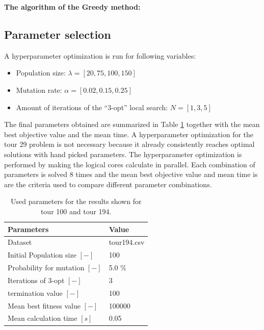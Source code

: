 \documentclass[a4paper,10pt]{article}
\newcommand{\ReplaceMe}[1]{{\color{blue}#1}}
\begin{document}
\textbf{The algorithm of the Greedy method:}

\subsection{Parameter selection}

A hyperparameter optimization is run for following variables:
\begin{itemize}
	\item Population size: $ \lambda = [20,75,100,150] $
	\item Mutation rate: $ \alpha = [0.02, 0.15,0.25]$
	\item Amount of iterations of the ``3-opt'' local search: $ N = [1,3,5] $
\end{itemize}

The final parameters obtained are summarized in Table \ref{t:parameters} together with the mean best objective value and the mean time. A hyperparameter optimization for the tour 29 problem is not necessary because it already consistently reaches optimal solutions with hand picked parameters. The hyperparameter optimization is performed by making the logical cores calculate in parallel. Each combination of parameters is solved $ 8 $ times and the mean best objective value and mean time is are the criteria used to compare different parameter combinations.

\begin{table}[h]
	\centering
	\begin{tabular}{|p{5.5cm}|p{2cm}|}
		\hline
		\textbf{Parameters} & \textbf{Value}\\ \hline
		Dataset  & tour194.csv\\ \hline
		Initial Population size $[-]$ & 100\\ \hline
		Probability for mutation $[-]$ & 5.0 $\%$\\ \hline
		Iterations of 3-opt $ [-] $ & 3 \\ \hline
 		termination value $[-]$ & 100\\ \hline
 		Mean best fitness value $[-]$ & 100000\\ \hline
 		Mean calculation time  $[s]$ & 0.05\\ \hline
	\end{tabular}
	\caption{Used parameters for the results shown for tour 100 and tour 194.}
	\label{t:parameters}
\end{table}
\end{document}
